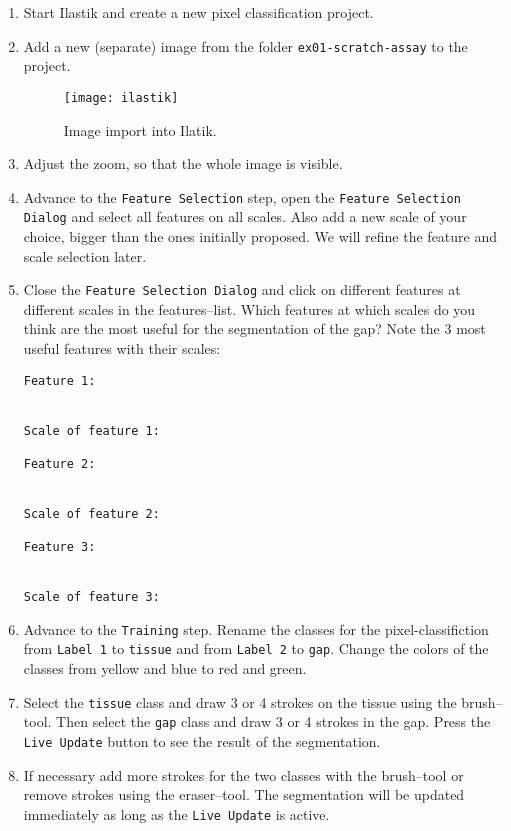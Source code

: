 \begin{enumerate}
\item Start Ilastik and create a new pixel classification project.
\item Add a new (separate) image from the folder {\tt ex01-scratch-assay} to the project.
\begin{figure}[!htb]
 \centering
 \texttt{[image: ilastik]}
 \caption{Image import into Ilatik.}
 \label{figure:ilastik}
\end{figure}
\item Adjust the zoom, so that the whole image is visible.
\item Advance to the {\tt Feature Selection} step, open the {\tt Feature Selection Dialog} and select all features on all scales. Also add a new scale of your choice, bigger than the ones initially proposed. We will refine the feature and scale selection later.
\item Close the {\tt Feature Selection Dialog} and click on different features at different scales in the features--list. Which features at which scales do you think are the most useful for the segmentation of the gap? Note the 3 most useful features with their scales:
\begin{verbatim}
Feature 1:


Scale of feature 1:

Feature 2:


Scale of feature 2:

Feature 3:


Scale of feature 3:

\end{verbatim} 
\item Advance to the {\tt Training} step. Rename the classes for the pixel-classifiction from {\tt Label 1} to {\tt tissue} and from {\tt Label 2} to {\tt gap}. Change the colors of the classes from yellow and blue to red and green.

\item Select the {\tt tissue} class and draw 3 or 4 strokes on the tissue using the brush--tool. Then select the {\tt gap} class and draw 3 or 4 strokes in the gap. Press the {\tt Live Update} button to see the result of the segmentation.

\item If necessary add more strokes for the two classes with the brush--tool or remove strokes using the eraser--tool. The segmentation will be updated immediately as long as the {\tt Live Update} is active.


\end{enumerate}

